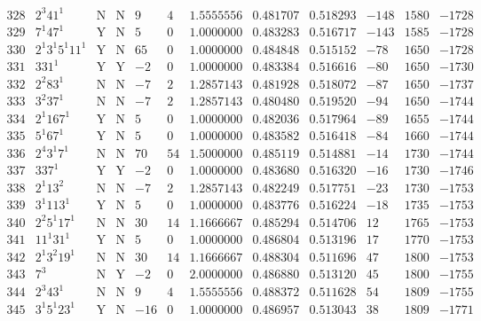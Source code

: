 \documentclass[11pt,reqno,a4letter]{article}
\numberwithin{figure}{section}
\numberwithin{table}{section}
\theoremstyle{plain}
\numberwithin{theorem}{section}
\theoremstyle{definition}
\begin{document}
\begin{table}[ht]
\begin{equation*}
{\begin{array}{cc|cc|ccc|cc|ccc}
 328 & 2^3 41^1 & \text{N} & \text{N} & 9 & 4 & 1.5555556 & 0.481707 & 0.518293 & -148 & 1580 & -1728 \\
 329 & 7^1 47^1 & \text{Y} & \text{N} & 5 & 0 & 1.0000000 & 0.483283 & 0.516717 & -143 & 1585 & -1728 \\
 330 & 2^1 3^1 5^1 11^1 & \text{Y} & \text{N} & 65 & 0 & 1.0000000 & 0.484848 & 0.515152 & -78 & 1650 & -1728 \\
 331 & 331^1 & \text{Y} & \text{Y} & -2 & 0 & 1.0000000 & 0.483384 & 0.516616 & -80 & 1650 & -1730 \\
 332 & 2^2 83^1 & \text{N} & \text{N} & -7 & 2 & 1.2857143 & 0.481928 & 0.518072 & -87 & 1650 & -1737 \\
 333 & 3^2 37^1 & \text{N} & \text{N} & -7 & 2 & 1.2857143 & 0.480480 & 0.519520 & -94 & 1650 & -1744 \\
 334 & 2^1 167^1 & \text{Y} & \text{N} & 5 & 0 & 1.0000000 & 0.482036 & 0.517964 & -89 & 1655 & -1744 \\
 335 & 5^1 67^1 & \text{Y} & \text{N} & 5 & 0 & 1.0000000 & 0.483582 & 0.516418 & -84 & 1660 & -1744 \\
 336 & 2^4 3^1 7^1 & \text{N} & \text{N} & 70 & 54 & 1.5000000 & 0.485119 & 0.514881 & -14 & 1730 & -1744 \\
 337 & 337^1 & \text{Y} & \text{Y} & -2 & 0 & 1.0000000 & 0.483680 & 0.516320 & -16 & 1730 & -1746 \\
 338 & 2^1 13^2 & \text{N} & \text{N} & -7 & 2 & 1.2857143 & 0.482249 & 0.517751 & -23 & 1730 & -1753 \\
 339 & 3^1 113^1 & \text{Y} & \text{N} & 5 & 0 & 1.0000000 & 0.483776 & 0.516224 & -18 & 1735 & -1753 \\
 340 & 2^2 5^1 17^1 & \text{N} & \text{N} & 30 & 14 & 1.1666667 & 0.485294 & 0.514706 & 12 & 1765 & -1753 \\
 341 & 11^1 31^1 & \text{Y} & \text{N} & 5 & 0 & 1.0000000 & 0.486804 & 0.513196 & 17 & 1770 & -1753 \\
 342 & 2^1 3^2 19^1 & \text{N} & \text{N} & 30 & 14 & 1.1666667 & 0.488304 & 0.511696 & 47 & 1800 & -1753 \\
 343 & 7^3 & \text{N} & \text{Y} & -2 & 0 & 2.0000000 & 0.486880 & 0.513120 & 45 & 1800 & -1755 \\
 344 & 2^3 43^1 & \text{N} & \text{N} & 9 & 4 & 1.5555556 & 0.488372 & 0.511628 & 54 & 1809 & -1755 \\
 345 & 3^1 5^1 23^1 & \text{Y} & \text{N} & -16 & 0 & 1.0000000 & 0.486957 & 0.513043 & 38 & 1809 & -1771 \\

\end{array}}
\end{equation*}
\end{table}
\end{document}
